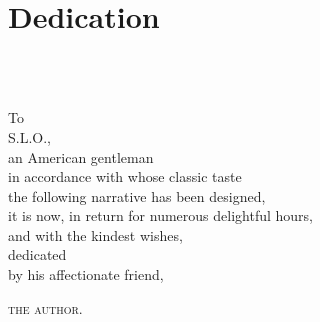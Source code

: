 \documentclass[
a5paper,
]{scrbook} %
\begin{document}
\frontmatter
\pagestyle{empty}

 
 
 
 
 
 



\pagestyle{plain}



\renewcommand{\contentsname}{\texttt{[image: contents]}}
\tableofcontents



\renewcommand{\listfigurename}{\texttt{[image: listofillustrations]}}
\listoffigures


\chapter*{Dedication}
~\\
~\\
\begin{center}\large
To\\
S.L.O.,\\ 
an American gentleman\\ 
in accordance with whose classic taste\\ 
the following narrative has been designed,\\ 
it is now, in return for numerous delightful hours,\\ 
and with the kindest wishes,\\
dedicated\\
 by his affectionate friend,\\
\begin{flushright}\scshape
the author.
\end{flushright}
\end{center}
\clearpage
\end{document}
